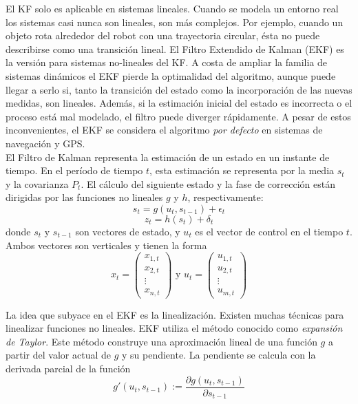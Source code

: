 El KF solo es aplicable en sistemas lineales. Cuando se modela un entorno real los sistemas casi nunca son lineales, son más complejos. Por ejemplo, cuando un objeto rota alrededor del robot con una trayectoria circular, ésta no puede describirse como una transición lineal. El Filtro Extendido de Kalman (EKF) es la versión para sistemas no-lineales del KF. A costa de ampliar la familia de sistemas dinámicos el EKF pierde la optimalidad del algoritmo, aunque puede llegar a serlo si, tanto la transición del estado como la incorporación de las nuevas medidas, son lineales. Además, si la estimación inicial del estado es incorrecta o el proceso está mal modelado, el filtro puede diverger rápidamente. A pesar de estos inconvenientes, el EKF se considera el algoritmo \textit{por defecto} en sistemas de navegación y GPS.\\

El Filtro de Kalman representa la estimación de un estado en un instante de tiempo. En el período de tiempo $t$, esta estimación se representa por la media $s_t$ y la covarianza $P_t$. El cálculo del siguiente estado y la fase de corrección están dirigidas por las funciones no lineales $g$ y $h$, respectivamente:
\begin{equation}
s_t = g(u_t, s_{t-1}) + \epsilon_t
\end{equation}
\begin{equation}
z_t = h(s_t) + \delta_t
\end{equation}
donde $s_t$ y $s_{t-1}$ son vectores de estado, y $u_t$ es el vector de control en el tiempo $t$. Ambos vectores son verticales y tienen la forma
\begin{equation}
x_t = \begin{pmatrix}
      x_{1,t} \\ 
      x_{2,t} \\ 
      \vdots \\ 
      x_{n,t}
      \end{pmatrix}
\text{ y }
u_t = \begin{pmatrix}
      u_{1,t} \\ 
      u_{2,t} \\ 
      \vdots \\ 
      u_{m,t}
      \end{pmatrix}
\end{equation}

La idea que subyace en el EKF es la linealización. Existen muchas técnicas para linealizar funciones no lineales. EKF utiliza el método conocido como \textit{expansión de Taylor}. Este método construye una aproximación lineal de una función $g$ a partir del valor actual de $g$ y su pendiente. La pendiente se calcula con la derivada parcial de la función
\begin{equation}
g'(u_t, s_{t-1}) := \frac{\partial g(u_t, s_{t-1})}{\partial s_{t-1}}
\end{equation}

